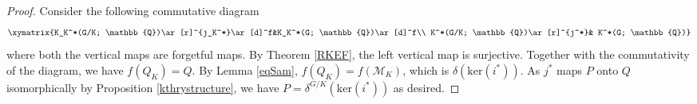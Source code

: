 \documentclass[11pt]{amsart}
\theoremstyle{plain}
\theoremstyle{definition}
\begin{document}
\begin{proof}
	Consider the following commutative diagram
	\begin{eqnarray}
		\xymatrix{K_K^*(G/K; \mathbb{Q})\ar[r]^{j_K^*}\ar[d]^f&K_K^*(G; \mathbb{Q})\ar[d]^f\\ K^*(G/K; \mathbb{Q})\ar[r]^{j^*}& K^*(G; \mathbb{Q})}
	\end{eqnarray}
	where both the vertical maps are forgetful maps. By Theorem \ref{RKEF}, the left vertical map is surjective. Together with the commutativity of the diagram, we have $f(Q_K)=Q$. By Lemma \ref{eqSam}, $f(Q_K)=f(\mathcal{M}_K)$, which is $\delta(\text{ker}(i^*))$. As $j^*$ maps $P$ onto $Q$ isomorphically by Proposition \ref{kthrystructure}, we have $P=\delta^{G/K}(\text{ker}(i^*))$ as desired.

\end{proof}
\end{document}
